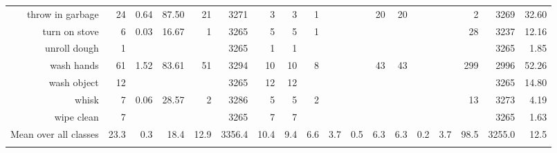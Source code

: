 \begin{tabular}{r r r@{\ \ }r@{\ \ }r@{\ \ }r@{\ \ }r r@{\ \ }r@{\ \ }r@{\ \ }r@{\ \ }r@{\ \ }r@{\ \ }r@{\ \ }r@{\ \ }r@{\ \ }r r}
throw in garbage & 24 & 0.64 & 87.50 & 21 & 3271 & 3 & 3 & 1 &  &  & 20 & 20 &  &  & 2 & 3269 & 32.60 \\
turn on stove & 6 & 0.03 & 16.67 & 1 & 3265 & 5 & 5 & 1 &  &  &  &  &  &  & 28 & 3237 & 12.16 \\
unroll dough & 1 &  &  &  & 3265 & 1 & 1 &  &  &  &  &  &  &  &  & 3265 & 1.85 \\
wash hands & 61 & 1.52 & 83.61 & 51 & 3294 & 10 & 10 & 8 &  &  & 43 & 43 &  &  & 299 & 2996 & 52.26 \\
wash object & 12 &  &  &  & 3265 & 12 & 12 &  &  &  &  &  &  &  &  & 3265 & 14.80 \\
whisk & 7 & 0.06 & 28.57 & 2 & 3286 & 5 & 5 & 2 &  &  &  &  &  &  & 13 & 3273 & 4.19 \\
wipe clean & 7 &  &  &  & 3265 & 7 & 7 &  &  &  &  &  &  &  &  & 3265 & 1.63 \\
\cmidrule(lr){1-1} \cmidrule(lr){2-2} \cmidrule(lr){3-7} \cmidrule(lr){8-17} \cmidrule(lr){18-18}
Mean over all classes&23.3&0.3&18.4&12.9&3356.4&10.4&9.4&6.6&3.7&0.5&6.3&6.3&0.2&3.7&98.5&3255.0&12.5
\\ \bottomrule \\ \end{tabular}
